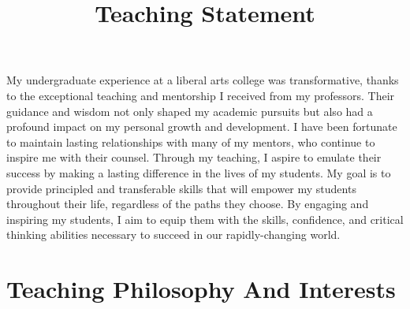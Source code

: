 \documentclass[11pt,a4paper,sans]{moderncv} %
\title{Teaching Statement}
\begin{document}
\makecvtitle %

\setlength\parskip{8px}
\vspace{-\parskip} 

My undergraduate experience at a liberal arts college was transformative, thanks to the exceptional teaching and mentorship I received from my professors. 
Their guidance and wisdom not only shaped my academic pursuits but also had a profound impact on my personal growth and development. 
I have been fortunate to maintain lasting relationships with many of my mentors, who continue to inspire me with their counsel. 
Through my teaching, I aspire to emulate their success by making a lasting difference in the lives of my students. 
My goal is to provide principled and transferable skills that will empower my students throughout their life, regardless of the paths they choose. 
By engaging and inspiring my students, I aim to equip them with the skills, confidence, and critical thinking abilities necessary to succeed in our rapidly-changing world.

\section{Teaching Philosophy And Interests}
\end{document}
